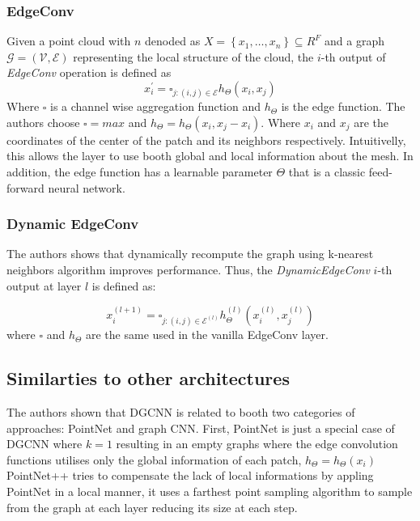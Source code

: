 \documentclass[twocolumn,showpacs,
  nofootinbib,aps,superscriptaddress,
  eqsecnum,prd,notitlepage,showkeys,10pt]{revtex4-1}
\begin{document}
\subsubsection{EdgeConv}
Given a point cloud with $n$ denoded as $X=\left\{x_{1}, \ldots, x_{n}\right\} \subseteq R^{F}$ and a graph $\mathcal{G}=(\mathcal{V}, \mathcal{E})$ representing the local structure of the cloud, the $i$-th output of \emph{EdgeConv} operation is defined as
\begin{equation}
  x_{i}^{\prime}=\square_{j :(i, j) \in \mathcal{E}} h_{\Theta}\left(x_{i}, x_{j}\right)
  \end{equation}
Where $\square$ is a channel wise aggregation function and $h_{\Theta}$ is the edge function. The authors choose $\square=max$ and $h_{\Theta} = h_{\Theta}(x_i, x_j - x_i)$. Where $x_i$ and $x_j$ are the coordinates of the center of the patch and its neighbors respectively. Intuitivelly, this allows the layer to use booth global and local information about the mesh. In addition, the edge function has a learnable parameter $\Theta$ that is a classic feed-forward neural network. 
\subsubsection{Dynamic EdgeConv}
The authors shows that dynamically recompute the graph using k-nearest neighbors algorithm improves performance. Thus, the \emph{DynamicEdgeConv} $i$-th output at layer $l$ is defined as:

\begin{equation}
  x_{i}^{(l+1)}=\square_{j :(i, j) \in \mathcal{E}^{(l)}} h_{\Theta}^{(l)}\left(x_{i}^{(l)}, x_{j}^{(l)}\right)
\end{equation}
where $\square$ and $h_{\Theta}$ are the same used in the vanilla EdgeConv layer.
\subsection{Similarties to other architectures}


The authors shown that DGCNN is related to booth two categories of approaches: PointNet and graph CNN.
First, PointNet is just a special case of DGCNN where $k=1$ resulting in an empty graphs where the edge convolution functions utilises only the global information of each patch, $h_{\Theta} = h_{\Theta}(x_i)$
PointNet++ \cite{1706.02413} tries to compensate the lack of local informations by appling PointNet in a local manner, it uses a farthest point sampling algorithm to sample from the graph at each layer reducing its size at each step.
\end{document}
